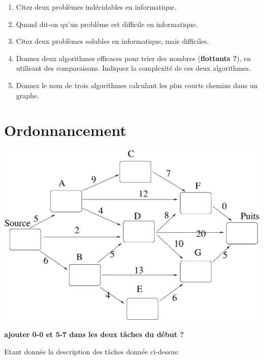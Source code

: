 \documentclass[11pt]{article}
\begin{document}
\begin{enumerate}
\item Citez deux problèmes indécidables en informatique.

\item  Quand dit-on qu'un problème est difficile en informatique.

\item  Citez deux problèmes solubles en informatique, mais difficiles.

\item  Donnez deux algorithmes efficaces pour trier des nombres (\textbf{flottants ?}), en utilisant des comparaisons. Indiquez la complexité de ces deux algorithmes.

\item   Donnez le nom de trois algorithmes calculant les plus courts chemins dans un graphe.
\end{enumerate}

\section{Ordonnancement}

\begin{center}
\includegraphics[width=0.7\linewidth]{critique.eps}
\end{center}

\textbf{ajouter 0-0 et 5-7 dans les deux tâches du début ?}

Etant donnée la description des tâches donnée ci-dessus: 
\end{document}

